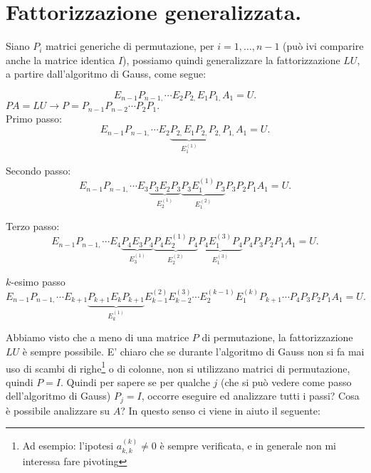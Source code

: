 \section{Fattorizzazione generalizzata.}
Siano $P_i$ matrici generiche di permutazione, per $i = 1, \ldots, n-1$ (può
ivi comparire anche
la matrice identica $I$), possiamo quindi generalizzare la fattorizzazione
$LU$, a partire dall'algoritmo di Gauss,
come segue:

\[E_{n-1}P_{n-1,} \cdots E_{2}P_{2,}E_{1}P_{1,}A_1 = U.\]
$PA = LU \longrightarrow P = P_{n-1}P_{n-2}\cdots P_2P_1.$\\

Primo passo:
\[E_{n-1}P_{n-1,} \cdots E_{2}\underbrace{P_{2,}E_{1}P_{2,}}_{E_1^{(1)}}
P_{2,}P_{1,}A_1 = U.\]

Secondo passo:
\[E_{n-1}P_{n-1,} \cdots E_3\underbrace{P_3E_2P_3}_{E_2^{(1)}}
\underbrace{P_3E_1^{(1)}P_3}_{E_1^{(2)}}P_3P_2P_1A_1 = U.\]

Terzo passo:
\[E_{n-1}P_{n-1,} \cdots E_4\underbrace{P_4E_3P_4}_{E_3^{(1)}}
\underbrace{P_4E_2^{(1)}P_4}_{E_2^{(2)}}
\underbrace{P_4E_1^{(3)}P_4}_{E_1^{(3)}}P_4P_3P_2P_1A_1 = U.\]

$k$-esimo passo
\[E_{n-1}P_{n-1,} \cdots E_{k+1}\underbrace{P_{k+1}E_kP_{k+1}}_{E_{k}^{(1)}}
E_{k-1}^{(2)}E_{k-2}^{(3)}\cdots E_2^{(k-1)}
E_1^{(k)}P_{k+1}\cdots P_4P_3P_2P_1A_1 = U.\]

Abbiamo visto che a meno di una matrice $P$ di permutazione, la fattorizzazione
$LU$ è sempre possibile. E' chiaro che se durante l'algoritmo di Gauss non si fa
mai uso di scambi di righe\footnote{Ad esempio: l'ipotesi $a_{k,k}^(k) \neq 0$
è sempre verificata, e in generale non mi interessa fare pivoting} o di colonne,
non si utilizzano matrici di permutazione, quindi $P=I$. Quindi per sapere se per qualche
$j$ (che si può vedere come passo dell'algoritmo di Gauss) $P_j = I$, occorre
eseguire ed analizzare tutti i passi? Cosa è possibile analizzare su $A$?
In questo senso ci viene in aiuto il seguente:

